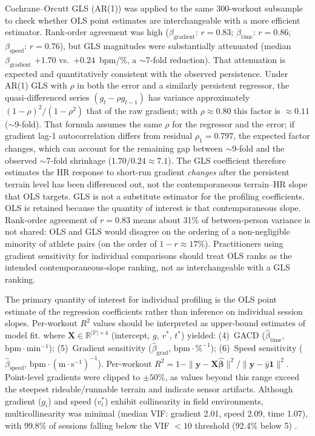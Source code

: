 \documentclass[times, twoside]{zHenriquesLab-StyleBioRxiv}
\begin{document}
Cochrane--Orcutt GLS (AR(1)) was applied to the same 300-workout subsample to check whether OLS point estimates are interchangeable with a more efficient estimator. Rank-order agreement was high ($\beta_{\text{gradient}}$: $r = 0.83$; $\beta_{\text{time}}$: $r = 0.86$; $\beta_{\text{speed}}$: $r = 0.76$), but GLS magnitudes were substantially attenuated (median $\beta_{\text{gradient}}$ $+1.70$ vs.\ $+0.24$~bpm/\%, a $\sim$7-fold reduction). That attenuation is expected and quantitatively consistent with the observed persistence. Under AR(1) GLS with $\rho$ in both the error and a similarly persistent regressor, the quasi-differenced series $(g_t - \rho g_{t-1})$ has variance approximately $(1-\rho)^2/(1-\rho^2)$ that of the raw gradient; with $\rho \approx 0.80$ this factor is $\approx 0.11$ ($\sim$9-fold). That formula assumes the same $\rho$ for the regressor and the error; if gradient lag-1 autocorrelation differs from residual $\rho_1 = 0.797$, the expected factor changes, which can account for the remaining gap between $\sim$9-fold and the observed $\sim$7-fold shrinkage ($1.70/0.24 \approx 7.1$). The GLS coefficient therefore estimates the HR response to short-run gradient \textit{changes} after the persistent terrain level has been differenced out, not the contemporaneous terrain--HR slope that OLS targets. GLS is not a substitute estimator for the profiling coefficients. OLS is retained because the quantity of interest is that contemporaneous slope. Rank-order agreement of $r = 0.83$ means about 31\% of between-person variance is not shared: OLS and GLS would disagree on the ordering of a non-negligible minority of athlete pairs (on the order of $1-r \approx 17\%$). Practitioners using gradient sensitivity for individual comparisons should treat OLS ranks as the intended contemporaneous-slope ranking, not as interchangeable with a GLS ranking.

The primary quantity of interest for individual profiling is the OLS point estimate of the regression coefficients rather than inference on individual session slopes. Per-workout $R^2$ values should be interpreted as upper-bound estimates of model fit.
where $\mathbf{X} \in \mathbb{R}^{|\mathcal{V}| \times 4}$ (intercept, $g$, $v^*$, $t^*$) yielded: (4)~GACD ($\hat{\beta}_{\text{time}}$, $\mathrm{bpm{\cdot}min^{-1}}$); (5)~Gradient sensitivity ($\hat{\beta}_{\text{grad}}$, $\mathrm{bpm{\cdot}\%^{-1}}$); (6)~Speed sensitivity ($\hat{\beta}_{\text{speed}}$, $\mathrm{bpm{\cdot}(m{\cdot}s^{-1})^{-1}}$). Per-workout $R^2 = 1 - \|\mathbf{y} - \mathbf{X}\hat{\boldsymbol{\beta}}\|^2 / \|\mathbf{y} - \bar{y}\mathbf{1}\|^2$. Point-level gradients were clipped to $\pm 50\%$, as values beyond this range exceed the steepest rideable/runnable terrain and indicate sensor artifacts. Although gradient ($g_i$) and speed ($v^*_i$) exhibit collinearity in field environments, multicollinearity was minimal (median VIF: gradient 2.01, speed 2.09, time 1.07), with 99.8\% of sessions falling below the VIF $< 10$ threshold (92.4\% below 5) \cite{hair2010}.
\end{document}
